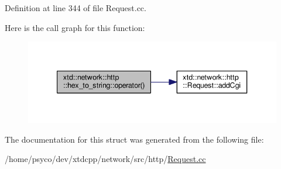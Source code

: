 Definition at line 344 of file Request.\+cc.




Here is the call graph for this function\+:
\nopagebreak
\begin{figure}[H]
\begin{center}
\leavevmode
\includegraphics[width=340pt]{structxtd_1_1network_1_1http_1_1hex__to__string_a88d313368d68cfdddb20e4496b73af87_cgraph}
\end{center}
\end{figure}




The documentation for this struct was generated from the following file\+:\begin{DoxyCompactItemize}
\item 
/home/psyco/dev/xtdcpp/network/src/http/\hyperlink{Request_8cc}{Request.\+cc}\end{DoxyCompactItemize}

